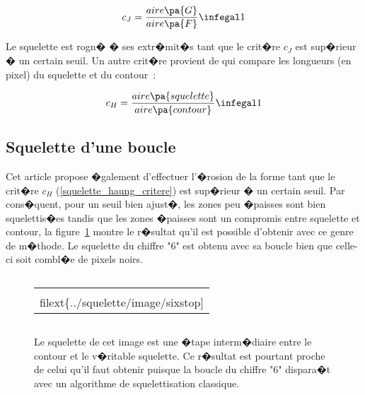                 \begin{eqnarray}
                c_J   =  \frac{ aire\pa{G} } { aire \pa{F} }  \infegal 1
                \end{eqnarray}
                
Le squelette est rogn� � ses extr�mit�s tant que le crit�re $c_J$ est sup�rieur � un certain seuil. Un autre crit�re provient de  qui compare les longueurs (en pixel) du squelette et du contour~:

                \begin{eqnarray}
                c_H   =  \frac{ aire\pa{squelette} } { aire \pa{contour} }  \infegal 1
                \label{squelette_haung_critere}
                \end{eqnarray}







\subsection{Squelette d'une boucle}


Cet article  propose �galement d'effectuer l'�rosion de la forme tant que le crit�re $c_H$ (\ref{squelette_haung_critere}) est sup�rieur � un certain seuil. Par cons�quent, pour un seuil bien ajust�, les zones peu �paisses sont bien squelettis�es tandis que les zones �paisses sont un compromis entre squelette et contour, la figure~\ref{squelette_barbule_six_stop} montre le r�sultat qu'il est possible d'obtenir avec ce genre de m�thode. Le squelette du chiffre "6" est obtenu avec sa boucle bien que celle-ci soit combl�e de pixels noirs.



            \begin{figure}[ht]
        $$\begin{tabular}{|c|}\hline
        \texttt{[image: \\filext\{../squelette/image/sixstop]}}
        \\ \hline \end{tabular}$$
        \caption{    Le squelette de cet image est une �tape interm�diaire entre le contour et le v�ritable squelette.
                            Ce r�sultat est pourtant proche de celui qu'il faut obtenir puisque la boucle du chiffre "6"
                            dispara�t avec un algorithme de squelettisation classique.}
        \label{squelette_barbule_six_stop}
            \end{figure}











